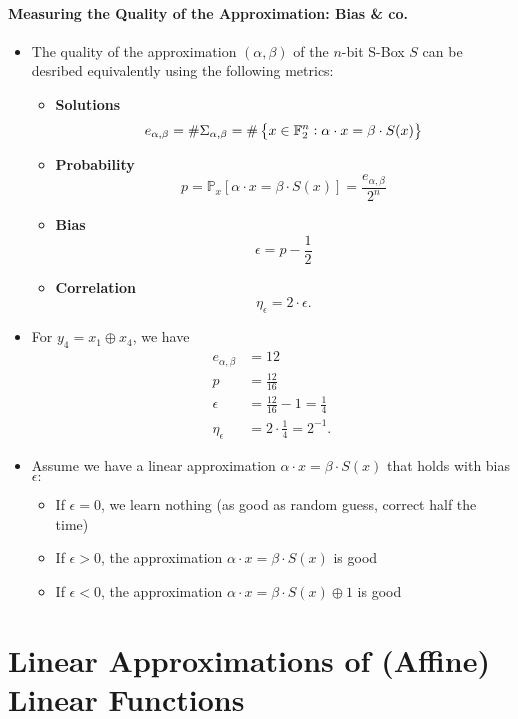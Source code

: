 \newpage
\paragraph{Measuring the Quality of the Approximation: Bias \& co.}

\begin{itemize}
	\item The quality of the approximation $(\alpha,\beta)$ of the $n$-bit S-Box $S$ can be desribed equivalently using the following metrics:
	\begin{itemize}
		\item \textbf{Solutions} \[
		e_{\alpha,\beta}=\#\Sigma_{\alpha,\beta}=\#\set{x\in\mathbb{F}_2^n:\alpha\cdot x=\beta\cdot S(x)}
		\]
		\item \textbf{Probability} \[
		p=\mathbb{P}_x\left[\alpha\cdot x=\beta\cdot S(x)\right]=\frac{e_{\alpha,\beta}}{2^n}
		\]
		\item \textbf{Bias} \[
		\epsilon=p-\frac{1}{2}
		\]
		\item \textbf{Correlation} \[
		\eta_\epsilon=2\cdot\epsilon.
		\]
	\end{itemize}
	\item For $y_4=x_1\oplus x_4$, we have \begin{align*}
	e_{\alpha,\beta} &= 12\\
	p&=\frac{12}{16}\\
	\epsilon&=\frac{12}{16}-1=\frac{1}{4}\\
	\eta_\epsilon &= 2\cdot\frac{1}{4}=2^{-1}.
	\end{align*}
	\item Assume we have a linear approximation $\alpha\cdot x=\beta\cdot S(x)$ that holds with bias $\epsilon:$
	\begin{itemize}
		\item If $\epsilon=0$, we learn nothing (as good as random guess, correct half the time)
		\item If $\epsilon>0$, the approximation $\alpha\cdot x=\beta\cdot S(x)$ is good
		\item If $\epsilon<0$, the approximation $\alpha\cdot x=\beta\cdot S(x)\oplus 1$ is good
	\end{itemize}
\end{itemize}

\newpage
\section{Linear Approximations of (Affine) Linear Functions}

